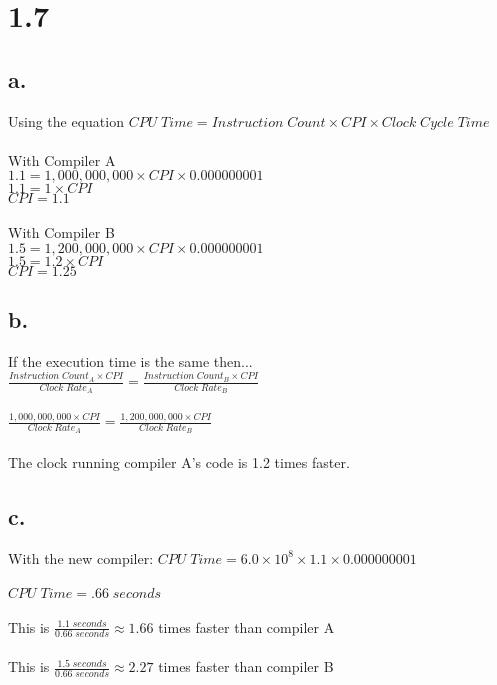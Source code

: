 \documentclass[12pt,letterpaper]{article}
\begin{document}
\section*{1.7}
\subsection*{a.}
Using the equation $CPU\;Time = Instruction\;Count \times CPI \times Clock\;Cycle\;Time$\\\\
With Compiler A\\
\indent $1.1 = 1,000,000,000 \times CPI \times 0.000000001$\\
\indent $1.1 = 1 \times CPI$\\
\indent $CPI = 1.1$\\\\
With Compiler B\\
\indent $1.5 = 1,200,000,000 \times CPI \times 0.000000001$\\
\indent $1.5 = 1.2 \times CPI$\\
\indent $CPI = 1.25$
\subsection*{b.}
If the execution time is the same then...\\
$\frac{Instruction\;Count_A \times CPI}{Clock\;Rate_A} = \frac{Instruction\;Count_B \times CPI}{Clock\;Rate_B}$\\\\
$\frac{1,000,000,000 \times CPI}{Clock\; Rate_A} = \frac{1,200,000,000 \times CPI}{Clock\;Rate_B}$\\\\
The clock running compiler A's code is 1.2 times faster.
\subsection*{c.}
With the new compiler: $CPU\;Time = 6.0\times 10^{8} \times 1.1 \times 0.000000001$\\\\
\indent $CPU\;Time = .66\;seconds$\\\\
\indent This is $\frac{1.1\;seconds}{0.66\;seconds} \approx 1.66$ times faster than compiler A\\\\
\indent This is $\frac{1.5\;seconds}{0.66\;seconds} \approx 2.27$ times faster than compiler B\\\\
\end{document}
